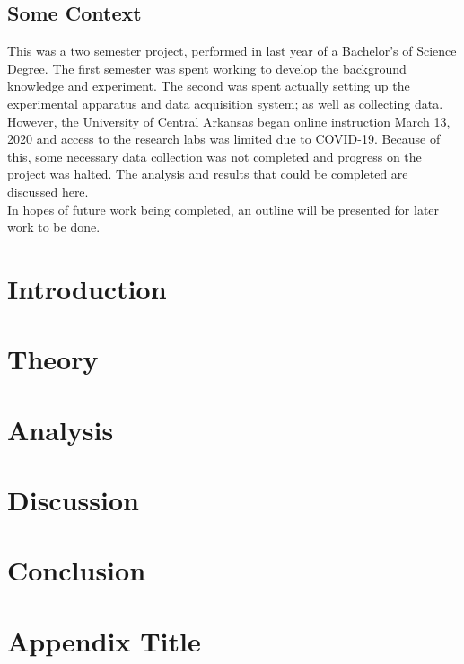 \documentclass[letterpaper]{report}
\begin{document}


\clearpage
\section{Some Context}
This was a two semester project, performed in last year of a Bachelor's of Science Degree. The first semester was spent working to develop the background knowledge and experiment. The second was spent actually setting up the experimental apparatus and data acquisition system; as well as collecting data. However, the University of Central Arkansas began online instruction March 13, 2020 and access to the research labs was limited due to COVID-19. Because of this, some necessary data collection was not completed and progress on the project was halted. The analysis and results that could be completed are discussed here. \\
In hopes of future work being completed, an outline will be presented for later work to be done.

\tableofcontents
\printnomenclature

\chapter{Introduction}\label{chap:Introduction}


\chapter{Theory}\label{chap:Theory}


\chapter{Analysis}\label{chap:Analysis}


\chapter{Discussion}\label{chap:Discussion}


\chapter{Conclusion}\label{chap:Conclusion}





\appendix
\chapter{Appendix Title}\label{chap:Appendix}

\end{document}
